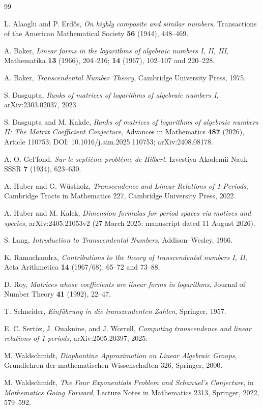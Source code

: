 \documentclass[11pt]{article}
\theoremstyle{definition}
\theoremstyle{remark}
\begin{document}
\begin{thebibliography}{99}

L. Alaoglu and P. Erd\H{o}s,
\emph{On highly composite and similar numbers},
Transactions of the American Mathematical Society \textbf{56} (1944), 448--469.

A. Baker,
\emph{Linear forms in the logarithms of algebraic numbers I, II, III},
Mathematika \textbf{13} (1966), 204--216; \textbf{14} (1967), 102--107 and 220--228.

A. Baker,
\emph{Transcendental Number Theory},
Cambridge University Press, 1975.

S. Dasgupta,
\emph{Ranks of matrices of logarithms of algebraic numbers I},
arXiv:2303.02037, 2023.

S. Dasgupta and M. Kakde,
\emph{Ranks of matrices of logarithms of algebraic numbers II: The Matrix Coefficient Conjecture},
Advances in Mathematics \textbf{487} (2026), Article 110753;
DOI: 10.1016/j.aim.2025.110753; arXiv:2408.08178.

A. O. Gel'fond,
\emph{Sur le septi\`eme probl\`eme de Hilbert},
Izvestiya Akademii Nauk SSSR \textbf{7} (1934), 623--630.

A. Huber and G. W\"ustholz,
\emph{Transcendence and Linear Relations of 1-Periods},
Cambridge Tracts in Mathematics 227, Cambridge University Press, 2022.

A. Huber and M. Kalck,
\emph{Dimension formulas for period spaces via motives and species},
arXiv:2405.21053v2 (27 March 2025; manuscript dated 11 August 2026).

S. Lang,
\emph{Introduction to Transcendental Numbers},
Addison--Wesley, 1966.

K. Ramachandra,
\emph{Contributions to the theory of transcendental numbers I, II},
Acta Arithmetica \textbf{14} (1967/68), 65--72 and 73--88.

D. Roy,
\emph{Matrices whose coefficients are linear forms in logarithms},
Journal of Number Theory \textbf{41} (1992), 22--47.

T. Schneider,
\emph{Einf\"uhrung in die transzendenten Zahlen},
Springer, 1957.

E. C. Sert\"oz, J. Ouaknine, and J. Worrell,
\emph{Computing transcendence and linear relations of 1-periods},
arXiv:2505.20397, 2025.

M. Waldschmidt,
\emph{Diophantine Approximation on Linear Algebraic Groups},
Grundlehren der mathematischen Wissenschaften 326, Springer, 2000.

M. Waldschmidt,
\emph{The Four Exponentials Problem and Schanuel's Conjecture},
in \emph{Mathematics Going Forward}, Lecture Notes in Mathematics 2313,
Springer, 2022, 579--592.

\end{thebibliography}
\end{document}
